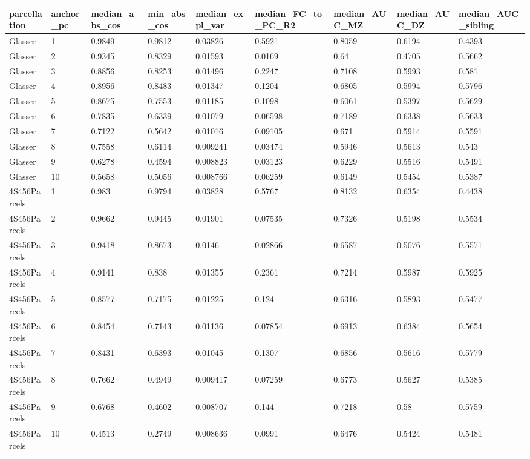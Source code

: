{\def\LTcaptype{none} %
\begin{longtable}[]{@{}lllllllll@{}}
\toprule\noalign{}
parcellation & anchor\_pc & median\_abs\_cos & min\_abs\_cos & median\_expl\_var & median\_FC\_to\_PC\_R2 & median\_AUC\_MZ & median\_AUC\_DZ & median\_AUC\_sibling \\
\midrule\noalign{}
\endhead
\bottomrule\noalign{}
\endlastfoot
Glasser & 1 & 0.9849 & 0.9812 & 0.03826 & 0.5921 & 0.8059 & 0.6194 & 0.4393 \\
Glasser & 2 & 0.9345 & 0.8329 & 0.01593 & 0.0169 & 0.64 & 0.4705 & 0.5662 \\
Glasser & 3 & 0.8856 & 0.8253 & 0.01496 & 0.2247 & 0.7108 & 0.5993 & 0.581 \\
Glasser & 4 & 0.8956 & 0.8483 & 0.01347 & 0.1204 & 0.6805 & 0.5994 & 0.5796 \\
Glasser & 5 & 0.8675 & 0.7553 & 0.01185 & 0.1098 & 0.6061 & 0.5397 & 0.5629 \\
Glasser & 6 & 0.7835 & 0.6339 & 0.01079 & 0.06598 & 0.7189 & 0.6338 & 0.5633 \\
Glasser & 7 & 0.7122 & 0.5642 & 0.01016 & 0.09105 & 0.671 & 0.5914 & 0.5591 \\
Glasser & 8 & 0.7558 & 0.6114 & 0.009241 & 0.03474 & 0.5946 & 0.5613 & 0.543 \\
Glasser & 9 & 0.6278 & 0.4594 & 0.008823 & 0.03123 & 0.6229 & 0.5516 & 0.5491 \\
Glasser & 10 & 0.5658 & 0.5056 & 0.008766 & 0.06259 & 0.6149 & 0.5454 & 0.5387 \\
4S456Parcels & 1 & 0.983 & 0.9794 & 0.03828 & 0.5767 & 0.8132 & 0.6354 & 0.4438 \\
4S456Parcels & 2 & 0.9662 & 0.9445 & 0.01901 & 0.07535 & 0.7326 & 0.5198 & 0.5534 \\
4S456Parcels & 3 & 0.9418 & 0.8673 & 0.0146 & 0.02866 & 0.6587 & 0.5076 & 0.5571 \\
4S456Parcels & 4 & 0.9141 & 0.838 & 0.01355 & 0.2361 & 0.7214 & 0.5987 & 0.5925 \\
4S456Parcels & 5 & 0.8577 & 0.7175 & 0.01225 & 0.124 & 0.6316 & 0.5893 & 0.5477 \\
4S456Parcels & 6 & 0.8454 & 0.7143 & 0.01136 & 0.07854 & 0.6913 & 0.6384 & 0.5654 \\
4S456Parcels & 7 & 0.8431 & 0.6393 & 0.01045 & 0.1307 & 0.6856 & 0.5616 & 0.5779 \\
4S456Parcels & 8 & 0.7662 & 0.4949 & 0.009417 & 0.07259 & 0.6773 & 0.5627 & 0.5385 \\
4S456Parcels & 9 & 0.6768 & 0.4602 & 0.008707 & 0.144 & 0.7218 & 0.58 & 0.5759 \\
4S456Parcels & 10 & 0.4513 & 0.2749 & 0.008636 & 0.0991 & 0.6476 & 0.5424 & 0.5481 \\
\end{longtable}
}


